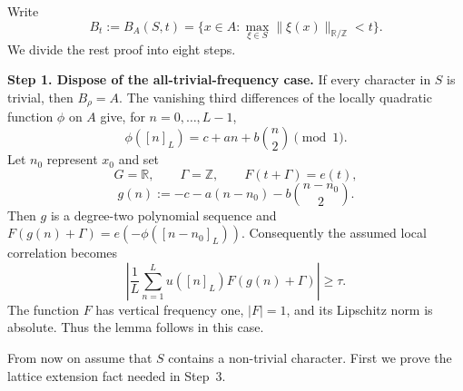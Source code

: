 \documentclass[twoside]{aomart}
\makeatletter
\theoremstyle{paperplain}
\theoremstyle{paperdefinition}
\renewenvironment{proof}[1][\proofname]{\par\pushQED{\qed}%
  \normalfont\topsep6\p@\@plus3\p@\relax\trivlist
  \item[\hskip\labelsep\itshape #1\@addpunct{.}]\ignorespaces
}{\popQED\endtrivlist\@endpefalse}
\numberwithin{equation}{section}
\makeatother
\begin{document}
\begin{proof}
Write
\[
 B_t:=B_A(S,t)=\{x\in A:\max_{\xi\in S}\|\xi(x)\|_{\mathbb R/\mathbb Z}<t\}.
\]
We divide the rest proof into eight steps.

\par
\medskip
\noindent\textbf{Step 1. Dispose of the all-trivial-frequency case.}
If every character in $S$ is trivial, then $B_\rho=A$.  The vanishing
third differences of the locally quadratic function $\phi$ on $A$ give, for $n=0,\ldots,L-1$,
\begin{equation*}
 \phi([n]_L)=c+an+b\binom n2\pmod1.
\end{equation*}
Let $n_0$ represent $x_0$ and set
\[
 G=\mathbb R,\qquad \Gamma=\mathbb Z,\qquad
 F(t+\Gamma)=e(t),
\]
\[
 g(n):=-c-a(n-n_0)-b\binom{n-n_0}{2}.
\]
Then $g$ is a degree-two polynomial sequence and
$F(g(n)+\Gamma)=e(-\phi([n-n_0]_L))$.  Consequently the assumed local
correlation becomes
\[
 \left|\frac1L\sum_{n=1}^L u([n]_L)F(g(n)+\Gamma)\right|\ge\tau.
\]
The function $F$ has vertical frequency one, $|F|=1$, and its Lipschitz
norm is absolute.  Thus the lemma follows in this case.

From now on assume that $S$ contains a non-trivial
character.  First we prove the lattice extension fact needed in Step~3.


\end{proof}
\end{document}
